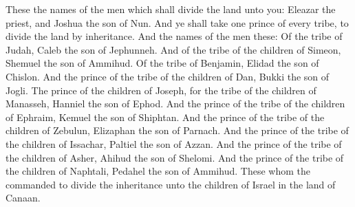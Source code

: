 {These
{} the
names of the
men which shall
divide the
land unto you:
Eleazar the
priest, and
Joshua the
son of
Nun.
And ye shall
take
one
prince of every
tribe, to
divide the
land by
inheritance.
And the
names of the
men
{} these: Of the
tribe of
Judah,
Caleb the
son of
Jephunneh.
And of the
tribe of the
children of
Simeon,
Shemuel the
son of
Ammihud.
Of the
tribe of
Benjamin,
Elidad the
son of
Chislon.
And the
prince of the
tribe of the
children of
Dan,
Bukki the
son of
Jogli.
The
prince of the
children of
Joseph, for the
tribe of the
children of
Manasseh,
Hanniel the
son of
Ephod.
And the
prince of the
tribe of the
children of
Ephraim,
Kemuel the
son of
Shiphtan.
And the
prince of the
tribe of the
children of
Zebulun,
Elizaphan the
son of
Parnach.
And the
prince of the
tribe of the
children of
Issachar,
Paltiel the
son of
Azzan.
And the
prince of the
tribe of the
children of
Asher,
Ahihud the
son of
Shelomi.
And the
prince of the
tribe of the
children of
Naphtali,
Pedahel the
son of
Ammihud.
These
{} whom the
{}
commanded to divide the
inheritance unto the
children of
Israel in the
land of
Canaan.

}
